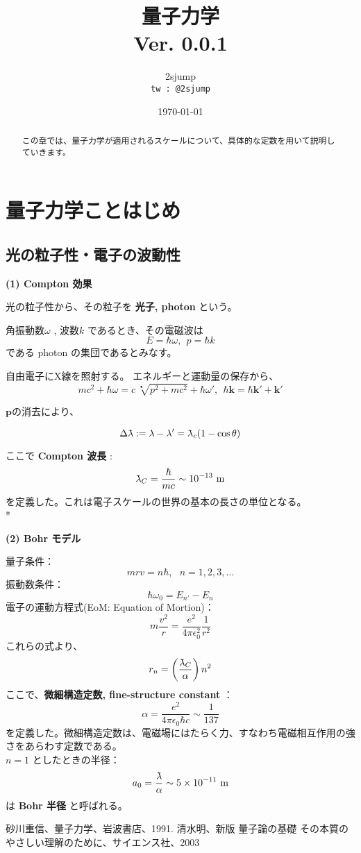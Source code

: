 \documentclass[a4j,10pt,oneside,openany]{jsbook}
\title{{\Huge \textbf{量子力学}}\\ {\small Ver. 0.0.1}}
\author{2sjump\\ \texttt{tw : @2sjump}}
\date{\today}
\newcommand{\lambdabar}{{\mkern0.75mu\mathchar '26\mkern -9.75mu\lambda}}
\begin{document}
\maketitle
\frontmatter
\tableofcontents
\mainmatter

\chapter{量子力学ことはじめ}
\begin{abstract}
	この章では、量子力学が適用されるスケールについて、具体的な定数を用いて説明していきます。
\end{abstract}


\section{光の粒子性・電子の波動性}
\textbf{(1) Compton 効果}

光の粒子性から、その粒子を  \textbf{光子, photon}  という。

角振動数$\omega$ , 波数$k$ であるとき、その電磁波は
\[
	E = \hbar \omega,\ \ p = \hbar k
\]
である photon の集団であるとみなす。

自由電子にX線を照射する。
エネルギーと運動量の保存から、
\[
	mc^2 + \hbar\omega = c\ \sqrt[•]{p^2 + mc^2} + \hbar \omega',\ \ \hbar \bm{k} = \hbar \bm{k'} + \bm{k}'
\]

$\bm{p}$の消去により、

\[
	\Delta \lambdabar := \lambda - \lambda' = \lambdabar_c(1-\cos \theta)
\]

ここで \textbf{Compton 波長} :
\[
	\lambdabar_C = \frac{\hbar}{mc} \sim 10^{-13}\ \mathrm{m}
\]
を定義した。これは電子スケールの世界の基本の長さの単位となる。
\vspace{0.2in} \\*

\textbf{(2) Bohr モデル}

量子条件：
\[
	mrv = n\hbar,\ \ \ n = 1,2,3,...
\]
振動数条件：
\[
	\hbar \omega_0 = E_{n'} - E_n
\]
電子の運動方程式(EoM: Equation of Mortion)：
\[
	m \frac{v^2}{r} = \frac{e^2}{4\pi \epsilon_0^2} \frac{1}{r^2}
\]
これらの式より、
\[
	r_n = \left( \frac{\lambdabar_C}{\alpha} \right) n^2
\]
ここで、\textbf{微細構造定数, fine-structure constant} ：
\[
	\alpha = \frac{e^2}{4\pi\epsilon_0 \hbar c} \sim \frac{1}{137}
\]
を定義した。微細構造定数は、電磁場にはたらく力、すなわち電磁相互作用の強さをあらわす定数である。\\
$n=1$ としたときの半径：
\[
	a_0 = \frac{\lambdabar}{\alpha} \sim 5 \times 10^{-11}\ \mathrm{m}
\]
は \textbf{Bohr 半径} と呼ばれる。

\begin{thebibliography}{20}
  砂川重信、量子力学、岩波書店、1991.
  清水明、新版 量子論の基礎 その本質のやさしい理解のために、サイエンス社、2003
\end{thebibliography}
\newpage
\printindex
%
%
\end{document}
